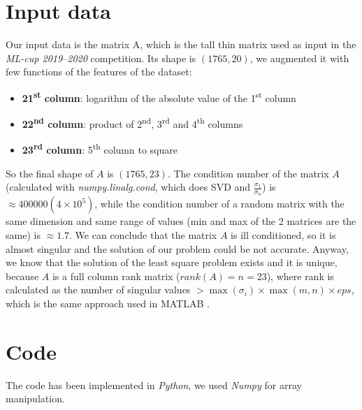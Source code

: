 \documentclass{article}
\begin{document}
\section{Input data}\label{sec:input-data}
Our input data is the matrix A, which is the tall thin matrix used as input in the \textit{ML-cup 2019--2020} competition.
Its shape is $(1765, 20)$, we augmented it with few functions of the features of the dataset:
\begin{itemize}
	\item \textbf{21\textsuperscript{st} column}: logarithm of the absolute value of the 1\textsuperscript{st} column
	\item \textbf{22\textsuperscript{nd} column}: product of 2\textsuperscript{nd}, 3\textsuperscript{rd} and 4\textsuperscript{th} columns
	\item \textbf{23\textsuperscript{rd} column}: 5\textsuperscript{th} column to square
\end{itemize}
So the final shape of $A$ is $(1765, 23)$.
    The condition number of the matrix $A$ (calculated with \textit{numpy.linalg.cond}, which does SVD and $\frac{\sigma_{1}}{\sigma_{n}}$) is $\approx 400000 (4 \times 10^{5})$, while the condition number of a random matrix with the same dimension and same range of values (min and max of the 2 matrices are the same) is $\approx 1.7$.
    We can conclude that the matrix $A$ is ill conditioned, so it is almost singular and the solution of our problem could be not accurate.
    Anyway, we know that the solution of the least square problem exists and it is unique, because $A$ is a full column rank matrix ($rank(A) = n = 23$), where rank is calculated as the number of singular values $> \max(\sigma_{i}) \times \max(m, n) \times eps$, which is the same approach used in MATLAB .

\section{Code}\label{sec:code}
The code has been implemented in \textit{Python}, we used \textit{Numpy} for array manipulation.
\end{document}
